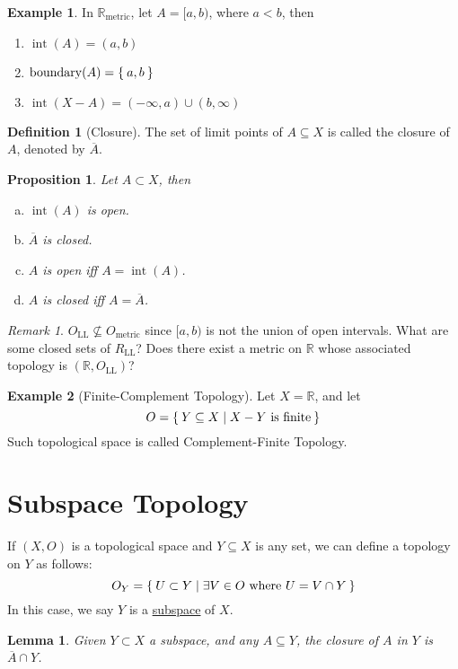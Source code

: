 \documentclass[12pt]{amsart}
\newcommand{\bbR}{\mathbb{R}}
\newcommand{\LL}{\operatorname{LL}}
\theoremstyle{plain}
\newtheorem*{prop}{Proposition}
\newtheorem*{lem}{Lemma}
\theoremstyle{remark}
\newtheorem*{rmk}{Remark}
\theoremstyle{definition}
\newtheorem*{define}{Definition}
\newtheorem*{eg}{Example}
\begin{document}
\begin{eg}
	In $\bbR_{\text{metric}}$, let $A = [a, b)$, where $a < b$, then
	\begin{enumerate}
		\item $\operatorname{int}(A) = (a, b)$
		\item $\operatorname{boundary}(A) = \Set{a, b}$
		\item $\operatorname{int}(X-A) = (-\infty, a) \cup (b, \infty)$
	\end{enumerate}
\end{eg}

\begin{define}[Closure]
	The set of limit points of $A\subseteq X$ is called the closure of $A$, denoted by $\overline{A}$.
\end{define}

\begin{prop}
	Let $A \subset X$, then
	\begin{enumerate} [(a)]
		\item $\operatorname{int}(A)$ is open.
		\item $\overline{A}$ is closed.
		\item $A$ is open iff $A = \operatorname{int}(A)$.
		\item $A$ is closed iff $A = \overline{A}$.
	\end{enumerate}
\end{prop}

\begin{rmk}
	$O_{\LL} \not\subseteq O_{\text{metric}}$ since $[a, b)$ is not the union of open intervals. What are some closed sets of $R_{\LL}$? Does there exist a metric on $\bbR$ whose associated topology is $(\bbR, O_{\LL})$?  
\end{rmk} 

\begin{eg}[Finite-Complement Topology]

	Let $X = \bbR$, and let
	\begin{equation*}
		O = \Set{Y \subseteq X | X - Y \text{ is finite}}
	\end{equation*}
	Such topological space is called Complement-Finite Topology.
\end{eg}

\section*{Subspace Topology}
If $(X, O)$ is a topological space and $Y \subseteq X$ is any set, we can define a topology on $Y$ as follows:
\begin{equation*}
	O_Y = \Set{U\subset Y | \exists V \in O \text{ where } U = V \cap Y}
\end{equation*}
In this case, we say $Y$ is a \ul{subspace} of $X$.
\begin{lem}
	Given $Y \subset X$ a subspace, and any $A \subseteq Y$, the closure of $A$ in $Y$ is $\overline{A} \cap Y$.
\end{lem}
\end{document}
